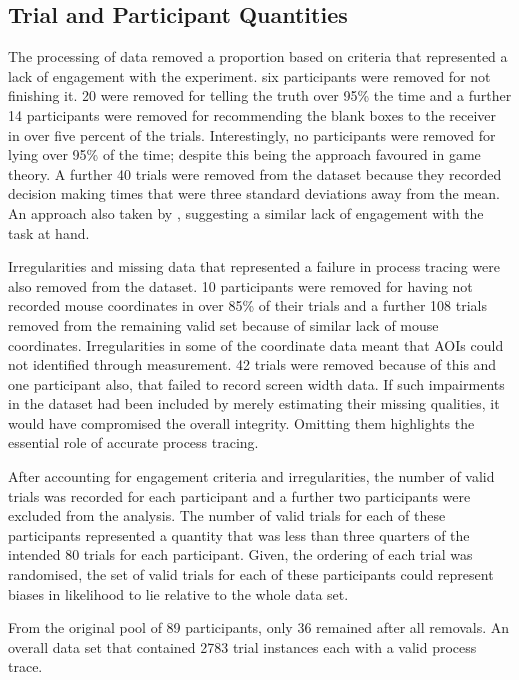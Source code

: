\documentclass[man, floatsintext]{apa7}
\begin{document}
\subsection{Trial and Participant Quantities}

The processing of data removed a proportion based on criteria that represented a lack of engagement with the experiment. six participants were removed for not finishing it. 20 were removed for telling the truth over 95\% the time and a further 14 participants were removed for recommending the blank boxes to the receiver in over five percent of the trials.  Interestingly, no participants were removed for lying over 95\% of the time; despite this being the approach favoured in game theory.  A further 40 trials were removed from the dataset because they recorded decision making times that were three standard deviations away from the mean. An approach also taken by \citeauthor{reeckSearchPredictsChanges2017b}, suggesting a similar lack of engagement with the task at hand.

Irregularities and missing data that represented a failure in process tracing were also removed from the dataset. 10 participants were removed for having not recorded mouse coordinates in over 85\% of their trials and a further 108 trials removed from the remaining valid set because of similar lack of mouse coordinates. Irregularities in some of the coordinate data meant that AOIs could not identified through measurement. 42 trials were removed because of this and one participant also, that failed to record screen width data. If such impairments in the dataset had been included by merely estimating their missing qualities, it would have compromised the overall integrity. Omitting them highlights the essential role of accurate process tracing.

After accounting for engagement criteria and irregularities, the number of valid trials was recorded for each participant and a further two participants were excluded from the analysis. The number of valid trials for each of these participants represented a quantity that was less than three quarters of the intended 80 trials for each participant. Given, the ordering of each trial was randomised, the set of valid trials for each of these participants could represent biases in likelihood to lie relative to the whole data set.

From the original pool of 89 participants, only 36 remained after all removals. An overall data set that contained 2783 trial instances each with a valid process trace.
\end{document}
